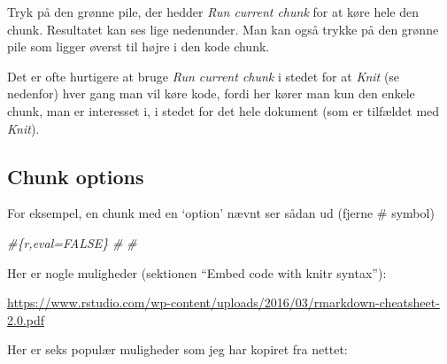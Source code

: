 \documentclass[
]{book}
\newenvironment{Shaded}{\begin{snugshade}}{\end{snugshade}}
\newcommand{\CommentTok}[1]{\textcolor[rgb]{0.56,0.35,0.01}{\textit{#1}}}
\begin{document}
Tryk på den grønne pile, der hedder \emph{Run current chunk} for at køre hele den chunk. Resultatet kan ses lige nedenunder. Man kan også trykke på den grønne pile som ligger øverst til højre i den kode chunk.

Det er ofte hurtigere at bruge \emph{Run current chunk} i stedet for at \emph{Knit} (se nedenfor) hver gang man vil køre kode, fordi her kører man kun den enkele chunk, man er interesset i, i stedet for det hele dokument (som er tilfældet med \emph{Knit}).

\hypertarget{chunk-options}{%
\subsection{Chunk options}\label{chunk-options}}

For eksempel, en chunk med en `option' nævnt ser sådan ud (fjerne \# symbol)

\begin{Shaded}
\begin{Highlighting}[]
\CommentTok{\#\textasciigrave{}\textasciigrave{}\textasciigrave{}\{r,eval=FALSE\}}
\CommentTok{\#}
\CommentTok{\#\textasciigrave{}\textasciigrave{}\textasciigrave{}}
\end{Highlighting}
\end{Shaded}

Her er nogle muligheder (sektionen ``Embed code with knitr syntax''):

\url{https://www.rstudio.com/wp-content/uploads/2016/03/rmarkdown-cheatsheet-2.0.pdf}

Her er seks populær muligheder som jeg har kopiret fra nettet:
\end{document}
